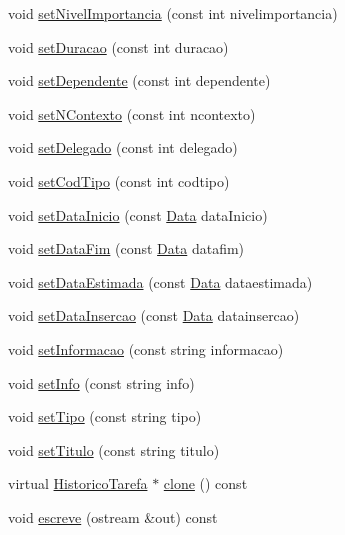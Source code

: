 \begin{DoxyCompactItemize}
\item 
void \hyperlink{class_historico_tarefa_a99499724e6263b5f8a3fb62e48adc754}{set\-Nivel\-Importancia} (const int nivelimportancia)
\item 
void \hyperlink{class_historico_tarefa_a9a7f4c965ef883e0938a8eb101dfda26}{set\-Duracao} (const int duracao)
\item 
void \hyperlink{class_historico_tarefa_a3a0fdc06b0e1bbd0c655e9a78e16260d}{set\-Dependente} (const int dependente)
\item 
void \hyperlink{class_historico_tarefa_af1310d62721d912db5781e33dc89a861}{set\-N\-Contexto} (const int ncontexto)
\item 
void \hyperlink{class_historico_tarefa_aae06155496505e0fbeadfed97e1f5966}{set\-Delegado} (const int delegado)
\item 
void \hyperlink{class_historico_tarefa_aca5a49945d01895dadc9bf5c36632453}{set\-Cod\-Tipo} (const int codtipo)
\item 
void \hyperlink{class_historico_tarefa_a9617a052b64c39d897bcca61cebd3b9d}{set\-Data\-Inicio} (const \hyperlink{class_data}{Data} data\-Inicio)
\item 
void \hyperlink{class_historico_tarefa_a3bbd9519565aafa08fcd9d908a692255}{set\-Data\-Fim} (const \hyperlink{class_data}{Data} datafim)
\item 
void \hyperlink{class_historico_tarefa_a2bc853efd0d75e60710e06707854134a}{set\-Data\-Estimada} (const \hyperlink{class_data}{Data} dataestimada)
\item 
void \hyperlink{class_historico_tarefa_a4629140940bfe7726c401d0a3cf41438}{set\-Data\-Insercao} (const \hyperlink{class_data}{Data} datainsercao)
\item 
void \hyperlink{class_historico_tarefa_a3768d68573b0375344de057cded7f50f}{set\-Informacao} (const string informacao)
\item 
void \hyperlink{class_historico_tarefa_abe5340fc9424ec2640645ce2063c7f1c}{set\-Info} (const string info)
\item 
void \hyperlink{class_historico_tarefa_a61240ab0ed7f31f2227ae2491f192cb7}{set\-Tipo} (const string tipo)
\item 
void \hyperlink{class_historico_tarefa_a55e39246c7817f1b8a6b06947be62438}{set\-Titulo} (const string titulo)
\item 
virtual \hyperlink{class_historico_tarefa}{Historico\-Tarefa} $\ast$ \hyperlink{class_historico_tarefa_aecc6f0f56ed88be90d997a435de93e2a}{clone} () const 
\item 
void \hyperlink{class_historico_tarefa_a69c0bf1b3a60ed3fdc787afc27bdd949}{escreve} (ostream \&out) const 
\end{DoxyCompactItemize}


